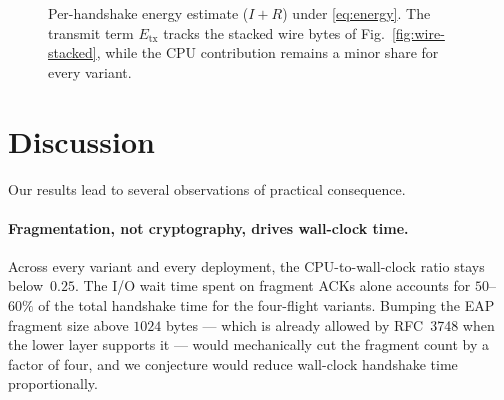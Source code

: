 \documentclass{easychair}
\begin{document}
\begin{figure}[H]
\centering
{}
\caption{Per-handshake energy estimate ($I\!+\!R$) under
\eqref{eq:energy}. The transmit term $E_{\mathrm{tx}}$ tracks the
stacked wire bytes of Fig.~\ref{fig:wire-stacked}, while the CPU
contribution remains a minor share for every variant.}
\label{fig:energy-stacked}
\end{figure}
\FloatBarrier


\section{Discussion}
\label{discussion}
Our results lead to several observations of practical consequence.

\paragraph{Fragmentation, not cryptography, drives wall-clock time.}
Across every variant and every deployment, the CPU-to-wall-clock ratio
stays below~$0.25$. The I/O wait time spent on fragment ACKs alone
accounts for $50$--$60\%$ of the total handshake time for the
four-flight variants. Bumping the EAP fragment size above $1024$
bytes --- which is already allowed by RFC~3748 when the lower layer
supports it --- would mechanically cut the fragment count by a factor
of four, and we conjecture would reduce wall-clock handshake time
proportionally.
\end{document}
